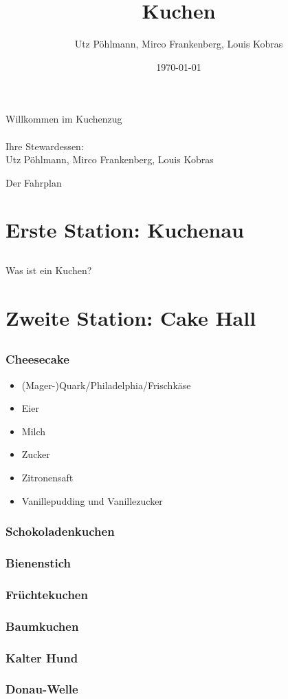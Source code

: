 \documentclass[pdf]{beamer}
\title{Kuchen}
\subtitle{}
\author{Utz Pöhlmann, Mirco Frankenberg, Louis Kobras}
\date{\footnotesize\today}
\begin{document}
\begin{frame}
	\titlepage\thispagestyle{empty}
\end{frame}
\begin{frame}
	\centering
	\Large{Willkommen im Kuchenzug}\\
	\-\\
	\large{Ihre Stewardessen:}\\
	\large{Utz Pöhlmann, Mirco Frankenberg, Louis Kobras}
\end{frame}
\begin{frame}{Der Fahrplan}
	\tableofcontents[hidesubsections]
\end{frame}
	\section{Erste Station: Kuchenau}
	\subsection*{}
		\begin{frame}
			\centering
			\Large{Was ist ein Kuchen?}
		\end{frame}
	\section{Zweite Station: Cake Hall}
	\subsection*{}
		\begin{frame}
		\frametitle{Cheesecake}
		\begin{itemize}
			\item (Mager-)Quark/Philadelphia/Frischkäse
			\item Eier
			\item Milch
			\item Zucker
			\item Zitronensaft
			\item Vanillepudding und Vanillezucker
		\end{itemize}
		\end{frame}
		\begin{frame}
		\frametitle{Schokoladenkuchen}
		\end{frame}
		\begin{frame}
		\frametitle{Bienenstich}
		\end{frame}
		\begin{frame}
		\frametitle{Früchtekuchen}
		\end{frame}
		\begin{frame}
		\frametitle{Baumkuchen}
		\end{frame}
		\begin{frame}
		\frametitle{Kalter Hund}
		\end{frame}
		\begin{frame}
		\frametitle{Donau-Welle}
		\end{frame}
\end{document}

